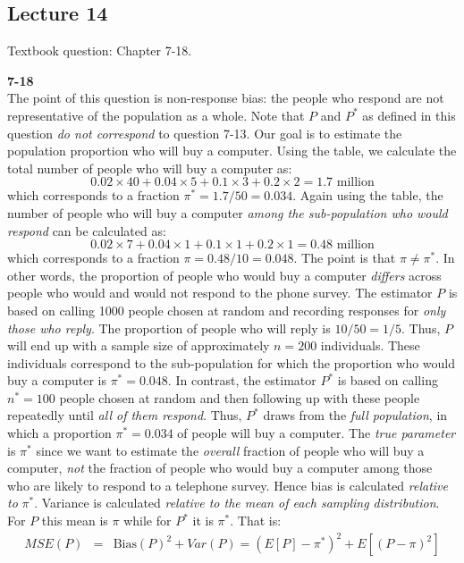 \documentclass[addpoints,12pt]{exam}\usepackage[]{graphicx}\usepackage[]{color}
\begin{document}
\begin{questions}
\section*{Lecture 14}

\question Textbook question: Chapter 7-18.
\begin{solution}
    \textbf{7-18}\\
    The point of this question is non-response bias: the people who respond are not representative of the population as a whole. Note that $P$ and $P^*$ as defined in this question \emph{do not correspond} to question 7-13. Our goal is to estimate the population proportion who will buy a computer. Using the table, we calculate the total number of people who will buy a computer as:
  $$0.02 \times 40 + 0.04\times 5 + 0.1\times 3 + 0.2\times 2 = 1.7 \mbox{ million}$$
which corresponds to a fraction $\pi^* = 1.7/50 = 0.034$. Again using the table, the number of people who will buy a computer \emph{among the sub-population who would respond} can be calculated as:
	$$0.02 \times 7 + 0.04\times 1 + 0.1\times 1 + 0.2\times 1 =  0.48 \mbox{ million}$$
which corresponds to a fraction $\pi = 0.48/10 = 0.048$. The point is that $\pi \neq \pi^*$. In other words, the proportion of people who would buy a computer \emph{differs} across people who would and would not respond to the phone survey. The estimator $P$ is based on calling 1000 people chosen at random and recording responses for \emph{only those who reply}. The proportion of people who will reply is $10/50 = 1/5$. Thus, $P$ will end up with a sample size of approximately $n=200$ individuals. These individuals correspond to the sub-population for which the proportion who would buy a computer is $\pi^* = 0.048$. In contrast, the estimator $P^*$ is based on calling $n^* = 100$ people chosen at random and then following up with these people repeatedly until \emph{all of them respond}. Thus, $P^*$ draws from the \emph{full population}, in which a proportion $\pi^* = 0.034$ of people will buy a computer. The \emph{true parameter} is $\pi^*$ since we want to estimate the \emph{overall} fraction of people who will buy a computer, \emph{not} the fraction of people who would buy a computer among those who are likely to respond to a telephone survey. Hence bias is calculated \emph{relative to} $\pi^*$. Variance is calculated \emph{relative to the mean of each sampling distribution}. For $P$ this mean is $\pi$ while for $P^*$ it is $\pi^*$. That is:
	\begin{eqnarray*}
		MSE(P) &=& \mbox{Bias}(P)^2 + Var(P) = (E[P] - \pi^*)^2 + E[(P - \pi)^2]\\

\end{eqnarray*}
\end{solution}
\end{questions}
\end{document}
